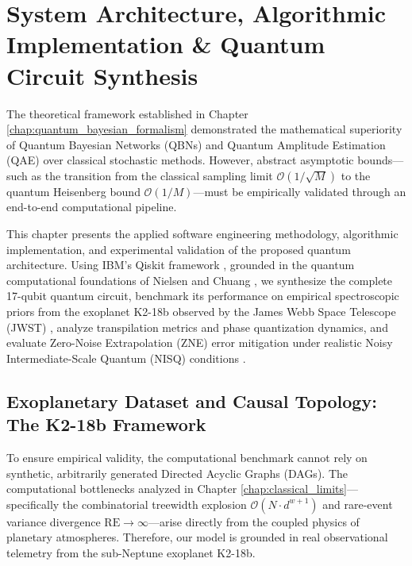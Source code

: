 \chapter{System Architecture, Algorithmic Implementation \& Quantum Circuit Synthesis}\label{chap:system_architecture}

The theoretical framework established in Chapter \ref{chap:quantum_bayesian_formalism} demonstrated the mathematical superiority of Quantum Bayesian Networks (QBNs) and Quantum Amplitude Estimation (QAE) over classical stochastic methods. However, abstract asymptotic bounds---such as the transition from the classical sampling limit $\mathcal{O}(1/\sqrt{M})$ to the quantum Heisenberg bound $\mathcal{O}(1/M)$---must be empirically validated through an end-to-end computational pipeline. 

This chapter presents the applied software engineering methodology, algorithmic implementation, and experimental validation of the proposed quantum architecture. Using IBM's Qiskit framework \cite{qiskit2021}, grounded in the quantum computational foundations of Nielsen and Chuang \cite{nielsen2010}, we synthesize the complete 17-qubit quantum circuit, benchmark its performance on empirical spectroscopic priors from the exoplanet K2-18b observed by the James Webb Space Telescope (JWST) \cite{madhusudhan2023}, analyze transpilation metrics and phase quantization dynamics, and evaluate Zero-Noise Extrapolation (ZNE) error mitigation under realistic Noisy Intermediate-Scale Quantum (NISQ) conditions \cite{preskill2018, temme2017, endo2018}.

\section{Exoplanetary Dataset and Causal Topology: The K2-18b Framework}\label{sec:k218b_framework}

To ensure empirical validity, the computational benchmark cannot rely on synthetic, arbitrarily generated Directed Acyclic Graphs (DAGs). The computational bottlenecks analyzed in Chapter \ref{chap:classical_limits}---specifically the combinatorial treewidth explosion $\mathcal{O}(N \cdot d^{w+1})$ and rare-event variance divergence $\mathrm{RE} \to \infty$---arise directly from the coupled physics of planetary atmospheres. Therefore, our model is grounded in real observational telemetry from the sub-Neptune exoplanet K2-18b.

